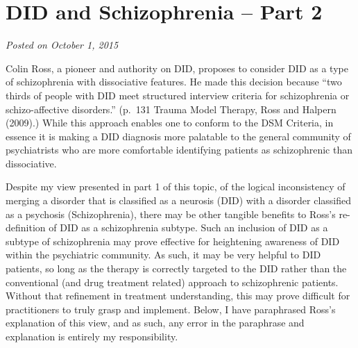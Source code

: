 \documentclass[]{book}
\begin{document}
\hypertarget{did-and-schizophrenia-part-2}{%
\section{DID and Schizophrenia -- Part 2}\label{did-and-schizophrenia-part-2}}

\emph{Posted on October 1, 2015}

Colin Ross, a pioneer and authority on DID, proposes to consider DID as a type of schizophrenia with dissociative features. He made this decision because ``two thirds of people with DID meet structured interview criteria for schizophrenia or schizo-affective disorders.'' (p.~131 Trauma Model Therapy, Ross and Halpern (2009).) While this approach enables one to conform to the DSM Criteria, in essence it is making a DID diagnosis more palatable to the general community of psychiatrists who are more comfortable identifying patients as schizophrenic than dissociative.

Despite my view presented in part 1 of this topic, of the logical inconsistency of merging a disorder that is classified as a neurosis (DID) with a disorder classified as a psychosis (Schizophrenia), there may be other tangible benefits to Ross's re-definition of DID as a schizophrenia subtype. Such an inclusion of DID as a subtype of schizophrenia may prove effective for heightening awareness of DID within the psychiatric community. As such, it may be very helpful to DID patients, so long as the therapy is correctly targeted to the DID rather than the conventional (and drug treatment related) approach to schizophrenic patients. Without that refinement in treatment understanding, this may prove difficult for practitioners to truly grasp and implement. Below, I have paraphrased Ross's explanation of this view, and as such, any error in the paraphrase and explanation is entirely my responsibility.
\end{document}
